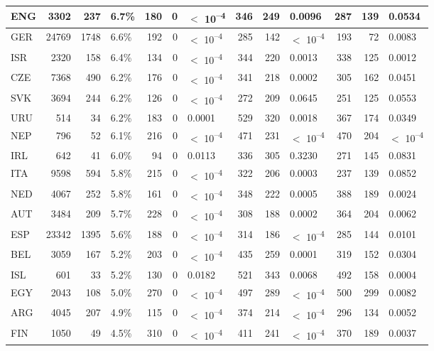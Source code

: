 \begin{tabular}{l|r|r|l|r|r|l|r|r|l|r|r|l}
\hline
ENG & 3302 & 237 & 6.7\% & 180 & 0 & $<$ 10\textsuperscript{--4} & 346 & 249 & 0.0096 & 287 & 139 & 0.0534\\
\hline
GER & 24769 & 1748 & 6.6\% & 192 & 0 & $<$ 10\textsuperscript{--4} & 285 & 142 & $<$ 10\textsuperscript{--4} & 193 & 72 & 0.0083\\
\hline
ISR & 2320 & 158 & 6.4\% & 134 & 0 & $<$ 10\textsuperscript{--4} & 344 & 220 & 0.0013 & 338 & 125 & 0.0012\\
\hline
CZE & 7368 & 490 & 6.2\% & 176 & 0 & $<$ 10\textsuperscript{--4} & 341 & 218 & 0.0002 & 305 & 162 & 0.0451\\
\hline
SVK & 3694 & 244 & 6.2\% & 126 & 0 & $<$ 10\textsuperscript{--4} & 272 & 209 & 0.0645 & 251 & 125 & 0.0553\\
\hline
URU & 514 & 34 & 6.2\% & 183 & 0 & 0.0001 & 529 & 320 & 0.0018 & 367 & 174 & 0.0349\\
\hline
NEP & 796 & 52 & 6.1\% & 216 & 0 & $<$ 10\textsuperscript{--4} & 471 & 231 & $<$ 10\textsuperscript{--4} & 470 & 204 & $<$ 10\textsuperscript{--4}\\
\hline
IRL & 642 & 41 & 6.0\% & 94 & 0 & 0.0113 & 336 & 305 & 0.3230 & 271 & 145 & 0.0831\\
\hline
ITA & 9598 & 594 & 5.8\% & 215 & 0 & $<$ 10\textsuperscript{--4} & 322 & 206 & 0.0003 & 237 & 139 & 0.0852\\
\hline
NED & 4067 & 252 & 5.8\% & 161 & 0 & $<$ 10\textsuperscript{--4} & 348 & 222 & 0.0005 & 388 & 189 & 0.0024\\
\hline
AUT & 3484 & 209 & 5.7\% & 228 & 0 & $<$ 10\textsuperscript{--4} & 308 & 188 & 0.0002 & 364 & 204 & 0.0062\\
\hline
ESP & 23342 & 1395 & 5.6\% & 188 & 0 & $<$ 10\textsuperscript{--4} & 314 & 186 & $<$ 10\textsuperscript{--4} & 285 & 144 & 0.0101\\
\hline
BEL & 3059 & 167 & 5.2\% & 203 & 0 & $<$ 10\textsuperscript{--4} & 435 & 259 & 0.0001 & 319 & 152 & 0.0304\\
\hline
ISL & 601 & 33 & 5.2\% & 130 & 0 & 0.0182 & 521 & 343 & 0.0068 & 492 & 158 & 0.0004\\
\hline
EGY & 2043 & 108 & 5.0\% & 270 & 0 & $<$ 10\textsuperscript{--4} & 497 & 289 & $<$ 10\textsuperscript{--4} & 500 & 299 & 0.0082\\
\hline
ARG & 4045 & 207 & 4.9\% & 115 & 0 & $<$ 10\textsuperscript{--4} & 374 & 214 & $<$ 10\textsuperscript{--4} & 296 & 134 & 0.0052\\
\hline
FIN & 1050 & 49 & 4.5\% & 310 & 0 & $<$ 10\textsuperscript{--4} & 411 & 241 & $<$ 10\textsuperscript{--4} & 370 & 189 & 0.0037\\

\end{tabular}
